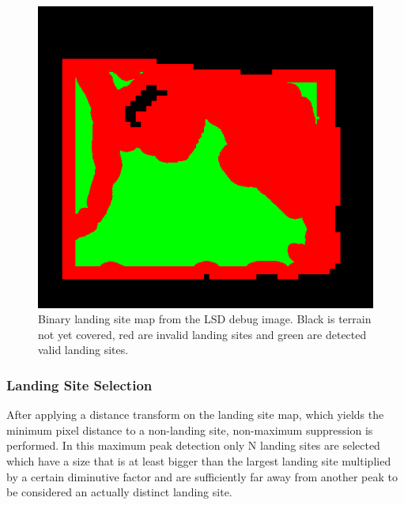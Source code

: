 \begin{figure}[ht!]
    \centering
    \includegraphics[scale=0.5]{images/system_overview/landing_map.png}
    \caption{Binary landing site map from the LSD debug image. Black is terrain not yet covered, red are invalid landing sites and green are detected valid landing sites.}
    \label{fig:ls_map}
\end{figure}

\subsubsection{Landing Site Selection}\label{subsubsec:setup:ls_select}

After applying a distance transform on the landing site map, which yields the minimum pixel distance to a non-landing site, non-maximum suppression is performed. In this maximum peak detection only N landing sites are selected which have a size that is at least bigger than the largest landing site multiplied by a certain diminutive factor and are sufficiently far away from another peak to be considered an actually distinct landing site.

